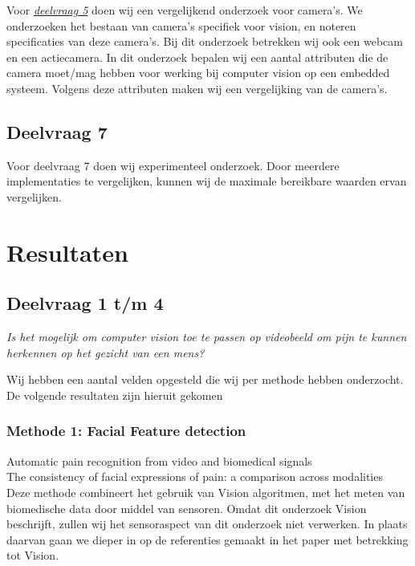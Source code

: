 \documentclass[11pt]{article}
\begin{document}
    Voor \emph{\hyperref[itm:dv1]{deelvraag 5}} doen wij een vergelijkend onderzoek voor camera's.
    We onderzoeken het bestaan van camera's specifiek voor vision, en noteren specificaties van deze camera's.
    Bij dit onderzoek betrekken wij ook een webcam en een actiecamera.
    In dit onderzoek bepalen wij een aantal attributen die de camera moet/mag hebben voor werking bij computer vision op een embedded systeem.
    Volgens deze attributen maken wij een vergelijking van de camera's.

    \subsection{Deelvraag 7}\label{subsec:uitvoering-deelvraag-6}

    Voor deelvraag 7 doen wij experimenteel onderzoek.
    Door meerdere implementaties te vergelijken, kunnen wij de maximale bereikbare waarden ervan vergelijken.


    \section{Resultaten}\label{sec:resultaten}

    \subsection{Deelvraag 1 t/m 4}\label{subsec:deelvraag-1-t/m-4}
    \emph{Is het mogelijk om computer vision toe te passen op videobeeld om pijn te kunnen herkennen op het gezicht van een mens?}

    Wij hebben een aantal velden opgesteld die wij per methode hebben onderzocht.
    De volgende resultaten zijn hieruit gekomen

    \subsubsection{Methode 1: Facial Feature detection}
    \emph{\citet{werner2014automatic}} Automatic pain recognition from video and biomedical signals\\
    \emph{\citet{prkachin1992consistency}} The consistency of facial expressions of pain: a comparison across modalities\\
    Deze methode combineert het gebruik van Vision algoritmen, met het meten van biomedische data door middel van sensoren.
    Omdat dit onderzoek Vision beschrijft, zullen wij het sensoraspect van dit onderzoek niet verwerken. In plaats daarvan gaan we dieper in op de referenties gemaakt in het paper met betrekking tot Vision.
\end{document}
